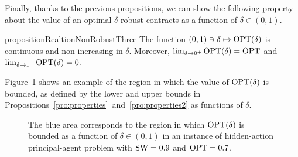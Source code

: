 Finally, thanks to the previous propositions, we can show the following property about the value of an optimal $\delta$-robust contracts as a function of $\delta \in (0,1)$.
%
%
\begin{restatable}{proposition}{RealtionNonRobustThree}\label{pro:properties2}
	The function $(0,1) \ni \delta \mapsto \textnormal{OPT}(\delta)$ is continuous and non-increasing in $\delta$.
	Moreover, $\lim_{\delta \to 0^+} \textnormal{OPT}(\delta)=\textnormal{OPT}$ and $\lim_{\delta \to 1^-} \textnormal{OPT}(\delta)=0$.
\end{restatable}
%
Figure~\ref{fig:jumps} shows an example of the region in which the value of $\textnormal{OPT}(\delta)$ is bounded, as defined by the lower and upper bounds in Propositions~\ref{pro:properties}~and~\ref{pro:properties2} as functions of $\delta$.
%
%
%

\begin{figure}[!t]
	\centering
	\resizebox{0.55\linewidth}{!}{}
	\caption{The blue area corresponds to the region in which $\textnormal{OPT}(\delta)$ is bounded as a function of $\delta \in (0,1)$ in an instance of hidden-action principal-agent problem with $\textnormal{SW}=0.9$ and $\textnormal{OPT}=0.7$. 
	}
	\label{fig:jumps}
\end{figure}

%
